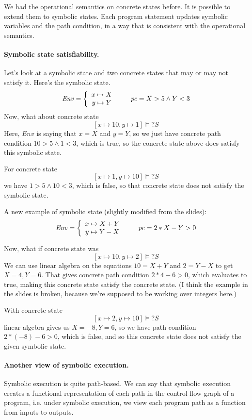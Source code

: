 \documentclass[11pt]{article}
\begin{document}
We had the operational semantics on concrete states before. It is possible to extend them to symbolic states. Each program statement updates symbolic variables and the path condition, in a way that is consistent with the operational semantics.

\paragraph{Symbolic state satisfiability.} Let's look at a symbolic state and two concrete states that may or may not satisfy it. Here's the symbolic state.
\[ \mathit{Env} = \left\{ \begin{array}{c} x \mapsto X \\ y \mapsto Y \end{array} \right. \hspace*{2em} \mathit{pc} = X > 5 \wedge Y < 3 \]
Now, what about concrete state
\[ [x \mapsto 10, y \mapsto 1] \models? S \]
Here, $\mathit{Env}$ is saying that $x = X$ and $y = Y$, so we just have concrete path condition $10 > 5 \wedge 1 < 3$, which is true, so the concrete state above does satisfy this symbolic state.

For concrete state 
\[ [x \mapsto 1, y \mapsto 10] \models? S \]
we have $1 > 5 \wedge 10 < 3$, which is false, so that concrete state does not satisfy the symbolic state.

A new example of symbolic state (slightly modified from the slides):
\[ \mathit{Env} = \left\{ \begin{array}{c} x \mapsto X + Y \\ y \mapsto Y - X \end{array} \right. \hspace*{2em} \mathit{pc} = 2 * X - Y > 0 \]

Now, what if concrete state was
\[ [x \mapsto 10, y \mapsto 2] \models? S \]
We can use linear algebra on the equations $10 = X + Y$ and $2 = Y - X$ to get $X = 4, Y = 6$. That gives concrete path condition $2 * 4 - 6 > 0$, which evaluates to true, making this concrete
state satisfy the concrete state. (I think the example in the slides is broken, because we're supposed to be working over integers here.)

With concrete state
\[ [x \mapsto 2, y \mapsto 10] \models? S \]
linear algebra gives us $X = -8, Y = 6$, so we have path condition $2 * (-8) - 6 > 0$, which is false, and so this concrete state does not satisfy the given symbolic state.

\paragraph{Another view of symbolic execution.} Symbolic execution is quite path-based. We can say that symbolic execution creates a functional representation of each path
in the control-flow graph of a program, i.e. under symbolic execution, we view each program path as a function from inputs to outputs.
\end{document}
